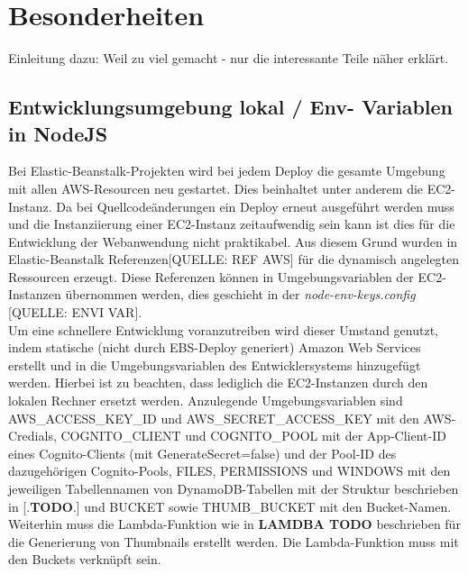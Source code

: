 \documentclass[a4paper, 12pt]{scrreprt}
\begin{document}
\chapter{Besonderheiten}
Einleitung dazu: Weil zu viel gemacht - nur die interessante Teile näher erklärt.

\section{Entwicklungsumgebung lokal / Env- Variablen in NodeJS}

Bei Elastic-Beanstalk-Projekten wird bei jedem Deploy die gesamte Umgebung mit allen AWS-Resourcen neu gestartet. Dies beinhaltet unter anderem die EC2-Instanz. Da bei Quellcodeänderungen ein Deploy erneut ausgeführt werden muss und die Instanziierung einer EC2-Instanz zeitaufwendig sein kann ist dies für die Entwicklung der Webanwendung nicht praktikabel. Aus diesem Grund wurden in Elastic-Beanstalk Referenzen[QUELLE: REF AWS] für die dynamisch angelegten Ressourcen erzeugt. Diese Referenzen können in Umgebungsvariablen der EC2-Instanzen übernommen werden, dies geschieht in der \textit{node-env-keys.config} [QUELLE: ENVI VAR].\\
Um eine schnellere Entwicklung voranzutreiben wird dieser Umstand genutzt, indem statische (nicht durch EBS-Deploy generiert) Amazon Web Services erstellt und in die Umgebungsvariablen des Entwicklersystems hinzugefügt werden.
Hierbei ist zu beachten, dass lediglich die EC2-Instanzen durch den lokalen Rechner ersetzt werden. Anzulegende Umgebungsvariablen sind
AWS\_ACCESS\_KEY\_ID und AWS\_SECRET\_ACCESS\_KEY mit den AWS-Credials, COGNITO\_CLIENT und COGNITO\_POOL mit der App-Client-ID eines Cognito-Clients (mit GenerateSecret=false) und der Pool-ID des dazugehörigen Cognito-Pools, FILES, PERMISSIONS und WINDOWS mit den jeweiligen Tabellennamen von DynamoDB-Tabellen mit der Struktur beschrieben in [.\textbf{TODO}.] und BUCKET sowie THUMB\_BUCKET mit den Bucket-Namen. Weiterhin muss die Lambda-Funktion wie in \textbf{LAMDBA TODO} beschrieben  für die Generierung von Thumbnails erstellt werden. Die Lambda-Funktion muss mit den Buckets verknüpft sein.  



\end{document}
